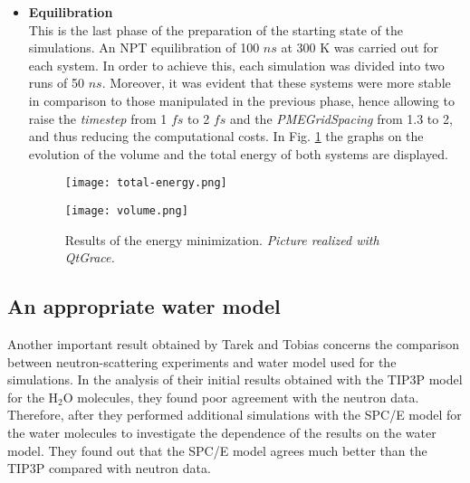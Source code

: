 \begin{itemize}
\item \textbf{Equilibration}\\
This is the last phase of the preparation of the starting state of the simulations. An NPT equilibration of 100 $ns$ at 300 K was carried out for each system. In order to achieve this, each simulation was divided into two runs of 50 $ns$. Moreover, it was evident that these systems were more stable in comparison to those manipulated in the previous phase, hence allowing to raise the \textit{timestep} from 1 $fs$ to 2 $fs$ and the \textit{PMEGridSpacing} from 1.3 to 2, and thus reducing the computational costs. In Fig. \ref{fig:trend-eq} the graphs on the evolution of the volume and the total energy of both systems are displayed.

\begin{figure}[H]
\centering
\begin{minipage}[t]{0.775\textwidth}
	\centering
    \texttt{[image: total-energy.png]}
    
    \texttt{[image: volume.png]}

    \footnotesize{\caption{Results of the energy minimization. \textit{Picture realized with QtGrace.}}
    \label{fig:trend-eq}
    }
\end{minipage} 
\end{figure}
\end{itemize}

\subsection{An appropriate water model}
Another important result obtained by Tarek and Tobias concerns the comparison between neutron-scattering experiments and water model used for the simulations. In the analysis of their initial results obtained with the TIP3P model \cite{jorgensen1983comparison} for the H$_2$O molecules, they found poor agreement with the neutron data. Therefore, after they performed additional simulations with the SPC/E \cite{berendsen1987missing} model for the water molecules to investigate the dependence of the results on the water model. They found out that the SPC/E model agrees much better than the TIP3P compared with neutron data. 


